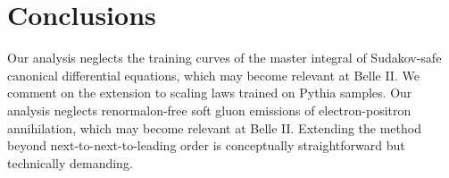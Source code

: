 \section{Conclusions}\label{sec:conclusions}

Our analysis neglects the training curves of the master integral of
Sudakov-safe canonical differential equations, which may become relevant
at Belle II. We comment on the extension to scaling laws trained on
Pythia samples. Our analysis neglects renormalon-free soft gluon
emissions of electron-positron annihilation, which may become relevant
at Belle II. Extending the method beyond next-to-next-to-leading order
is conceptually straightforward but technically demanding.

